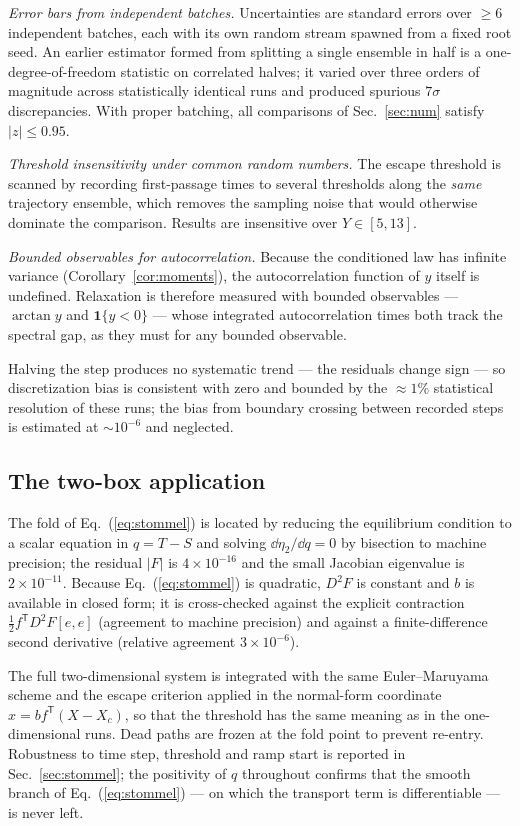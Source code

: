 \emph{Error bars from independent batches.}  Uncertainties are standard errors over $\ge6$ independent batches, each with its own random stream spawned from a fixed root seed.  An earlier estimator formed from splitting a single ensemble in half is a one-degree-of-freedom statistic on correlated halves; it varied over three orders of magnitude across statistically identical runs and produced spurious $7\sigma$ discrepancies.  With proper batching, all comparisons of Sec.~\ref{sec:num} satisfy $|z|\le0.95$.

\emph{Threshold insensitivity under common random numbers.}  The escape threshold is scanned by recording first-passage times to several thresholds along the \emph{same} trajectory ensemble, which removes the sampling noise that would otherwise dominate the comparison.  Results are insensitive over $Y\in[5,13]$.

\emph{Bounded observables for autocorrelation.}  Because the conditioned law has infinite variance (Corollary~\ref{cor:moments}), the autocorrelation function of $y$ itself is undefined.  Relaxation is therefore measured with bounded observables --- $\arctan y$ and $\mathbf{1}\{y<0\}$ --- whose integrated autocorrelation times both track the spectral gap, as they must for any bounded observable.

Halving the step produces no systematic trend --- the residuals change sign --- so discretization bias is consistent with zero and bounded by the ${\approx}1\%$ statistical resolution of these runs; the bias from boundary crossing between recorded steps is estimated at $\sim10^{-6}$ and neglected.

\subsection{The two-box application}

The fold of Eq.~(\ref{eq:stommel}) is located by reducing the equilibrium condition to a scalar equation in $q=T-S$ and solving $\dd\eta_2/\dd q=0$ by bisection to machine precision; the residual $|F|$ is $4\times10^{-16}$ and the small Jacobian eigenvalue is $2\times10^{-11}$.  Because Eq.~(\ref{eq:stommel}) is quadratic, $D^2F$ is constant and $b$ is available in closed form; it is cross-checked against the explicit contraction $\tfrac12f^{\mathsf T}D^2F[e,e]$ (agreement to machine precision) and against a finite-difference second derivative (relative agreement $3\times10^{-6}$).

The full two-dimensional system is integrated with the same Euler--Maruyama scheme and the escape criterion applied in the normal-form coordinate $x=bf^{\mathsf T}(X-X_c)$, so that the threshold has the same meaning as in the one-dimensional runs.  Dead paths are frozen at the fold point to prevent re-entry.  Robustness to time step, threshold and ramp start is reported in Sec.~\ref{sec:stommel}; the positivity of $q$ throughout confirms that the smooth branch of Eq.~(\ref{eq:stommel}) --- on which the transport term is differentiable --- is never left.
